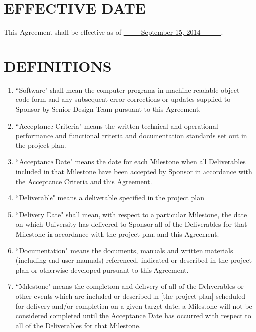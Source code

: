 \section{EFFECTIVE DATE }

This Agreement shall be effective as of \underline{~~~~~September 15, 2014~~~~~~}.  

\section{DEFINITIONS }
\begin{enumerate}  \itemsep4pt \parskip0pt 
\item ``Software" shall mean the computer programs in machine readable       object code form and any subsequent error corrections or updates       supplied to Sponsor by Senior Design Team pursuant to this Agreement.     

\item ``Acceptance Criteria" means the written technical and operational       performance and functional criteria and documentation standards       set out in the project plan. 

\item ``Acceptance Date" means the date for each Milestone when all       Deliverables included in that Milestone have been accepted by       Sponsor in accordance with the Acceptance Criteria and this       Agreement. 

\item  ``Deliverable" means a deliverable specified in the project plan.    

\item  ``Delivery Date" shall mean, with respect to a particular       Milestone, the date on which University has delivered to Sponsor       all of the Deliverables for that Milestone in accordance with       the project plan and this Agreement.    

\item  ``Documentation" means the documents, manuals and written materials       (including end-user manuals) referenced, indicated or described       in the project plan or otherwise developed pursuant to this       Agreement.    

\item  ``Milestone" means the completion and delivery of all of the       Deliverables or other events which are included or described in       [the project plan] scheduled for delivery and/or completion on a       given target date; a Milestone will not be considered completed       until the Acceptance Date has occurred with respect to all of the       Deliverables for that Milestone.  
\end{enumerate}

